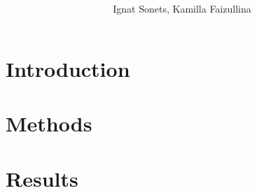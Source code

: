 \documentclass{article}
\title{  }
\author{ Ignat Sonets, Kamilla Faizullina}
\date{\empty}
\begin{document}
\maketitle
 
 
 
\section{Introduction}
 
 
 
 

\section{Methods}
 
 
 
 

\section{Results}
 
\end{document}
